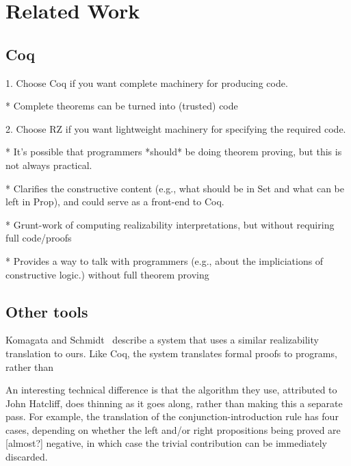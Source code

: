 \section{Related Work}
\subsection{Coq}
\label{sec:comparison-with-coq}


1. Choose Coq if you want complete machinery for producing code.

     * Complete theorems can be turned into (trusted) code

2. Choose RZ if you want lightweight machinery for specifying the required code.

     * It's possible that programmers *should* be doing theorem proving,
       but this is not always practical.

     * Clarifies the constructive content (e.g., what should be in Set
       and what can be left in Prop), and could serve as a front-end to
       Coq.

     * Grunt-work of computing realizability interpretations, but without
        requiring full code/proofs

     * Provides a way to talk with programmers (e.g., about the impliciations
       of constructive logic.) without full theorem proving

\subsection{Other tools}

Komagata and Schmidt~\cite{komagata+:tr95} describe a system that uses
a similar realizability translation to ours.  Like Coq, the system
translates formal proofs to programs, rather than 

An interesting technical difference is that the algorithm they use,
attributed to John Hatcliff, does thinning as it goes along, rather
than making this a separate pass.  For example, the translation of the
conjunction-introduction rule has four cases, depending on whether the
left and/or right propositions being proved are [almost?] negative, in which
case the trivial contribution can be immediately discarded.

